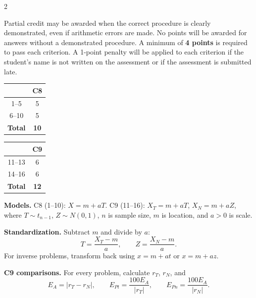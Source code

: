 \begin{multicols}{2}

Partial credit may be awarded when the correct procedure is clearly demonstrated, even if arithmetic errors are made. No points will be awarded for answers without a demonstrated procedure. A minimum of \textbf{4 points} is required to pass each criterion. A 1-point penalty will be applied to each criterion if the student's name is not written on the assessment or if the assessment is submitted late.

\vspace{-4mm}
\begin{center}
	\begin{tabular}{|c|c|}
		\hline
		\textbf{\textnumero} & \textbf{C8} \\ \hline
		1--5 & 5 \\ \hline
		6--10 & 5 \\ \hline
		\textbf{Total} & \textbf{10} \\ \hline
	\end{tabular}
	\hspace{1cm}
	\begin{tabular}{|c|c|}
		\hline
		\textbf{\textnumero} & \textbf{C9} \\ \hline
		11--13 & 6 \\ \hline
		14--16 & 6 \\ \hline
		\textbf{Total} & \textbf{12} \\ \hline
	\end{tabular}
\end{center}
\vspace{-4mm}




\textbf{Models.} C8 (1--10): $X=m+aT$.
C9 (11--16): $X_T=m+aT$, $X_N=m+aZ$, where
$T\sim t_{n-1}$, $Z\sim N(0,1)$, $n$ is sample size,
$m$ is location, and $a>0$ is scale.

\textbf{Standardization.} Subtract $m$ and divide by $a$:
\[
T=\frac{X_T-m}{a},\qquad Z=\frac{X_N-m}{a}.
\]
For inverse problems, transform back using
$x=m+at$ or $x=m+az$.

\textbf{C9 comparisons.} For every problem, calculate
$r_T$, $r_N$, and
\[
E_A=|r_T-r_N|,\qquad
E_{Pt}=\frac{100E_A}{|r_T|},\qquad
E_{Pn}=\frac{100E_A}{|r_N|}.
\]




\end{multicols}
